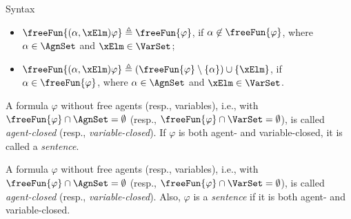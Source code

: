 \begin{subsection}{Syntax}
\begin{itemize}
									\vspace{-0.35em}
									\item\label{def:sl(freeagvar:bndprs)}
										$\freeFun{(\alpha, \xElm) \varphi} \defeq \freeFun{\varphi}$, if $\alpha
										\not\in \freeFun{\varphi}$, where $\alpha \in \AgnSet$ and $\xElm \in
										\VarSet$;
									\vspace{-0.35em}
									\item\label{def:sl(freeagvar:bndrem)}
										$\freeFun{(\alpha, \xElm) \varphi} \defeq (\freeFun{\varphi} \setminus
										\{ \alpha \}) \cup \{ \xElm \}$, if $\alpha \in \freeFun{\varphi}$,
										where $\alpha \in \AgnSet$ and $\xElm \in \VarSet$.
								\end{itemize}
								A formula $\varphi$ without free agents (resp., variables), i.e., with
								$\freeFun{\varphi} \cap \AgnSet = \emptyset$ (resp., $\freeFun{\varphi}
								\cap \VarSet = \emptyset$), is called \emph{agent-closed} (resp.,
								\emph{variable-closed}).
								If $\varphi$ is both agent- and variable-closed, it is called a
								\emph{sentence}.
					
					
											
			A formula $\varphi$ without free agents (resp., variables), i.e.,
			with $\freeFun{\varphi} \cap \AgnSet = \emptyset$ (resp.,
			$\freeFun{\varphi} \cap \VarSet = \emptyset$), is called
			\emph{agent-closed} (resp., \emph{variable-closed}).
			Also, $\varphi$ is a \emph{sentence} if it is  both agent- and
			variable-closed. 
			

\end{subsection}
